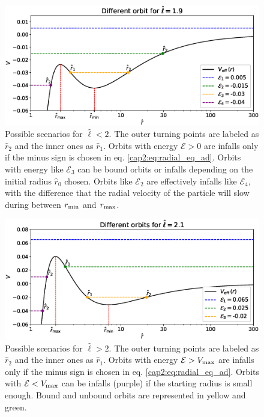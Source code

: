 \begin{figure}
    \centering
    \includegraphics[width=\textwidth]{Figures/chapter2/scenario1.eps}
    \caption{Possible scenarios for $\hat \ell < 2$.
    The outer turning points are labeled as $\hat r_2$ and the inner ones as
    $\hat r_1$.
    Orbits with energy $\mathcal E > 0$ are infalls only if the minus sign is
    chosen in eq. \ref{cap2:eq:radial_eq_ad}.
    Orbits with energy like $\mathcal E_3$ can be bound orbits or infalls
    depending on the initial radius $\hat r_0$ chosen.
    Orbits like $\mathcal E_2$ are effectively infalls like $\mathcal E_4$, with
    the difference that the radial velocity of the particle will slow during
    between $r_{\rm min}$ and $r_{\rm max}$.}
    \label{cap2:fig:scenario1}
\end{figure}

\begin{figure}
    \centering
    \includegraphics[width=\textwidth]{Figures/chapter2/scenario2.eps}
    \caption{Possible scenarios for $\hat \ell > 2$.
    The outer turning points are labeled as $\hat r_2$ and the inner ones as
    $\hat r_1$.
    Orbits with energy $\mathcal E > V_{\rm max}$ are infalls only if the minus
    sign is chosen in eq. \ref{cap2:eq:radial_eq_ad}.
    Orbits with $\mathcal E < V_{\rm max}$ can be infalls (purple) if the starting
    radius is small enough.
    Bound and unbound orbits are represented in yellow and green.}
    \label{cap2:fig:scenario2}
\end{figure}

